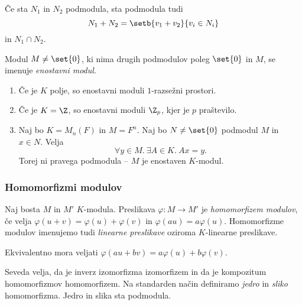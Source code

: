 \begin{trditev}
    Če sta $N_1$ in $N_2$ podmodula, sta podmodula tudi
    \[
        N_1 + N_2 = \setb{v_1 + v_2}{v_i \in N_i}
    \]
    in $N_1 \cap N_2$.
\end{trditev}


\begin{definicija}
    Modul $M \neq \set{0}$, ki nima drugih podmodulov poleg $\set{0}$ in $M$, se imenuje 
    \emph{enostavni modul}.
\end{definicija}

\begin{primer}
    \begin{enumerate}[(1)]
        \item Če je $K$ polje, so enostavni moduli $1$-razsežni prostori.
        \item Če je $K = \Z$, so enostavni moduli $\Z_p$, kjer je $p$ praštevilo.
        \item Naj bo $K = M_n(F)$ in $M = F^n$. Naj bo $N \neq \set{0}$ podmodul $M$ in 
        $x \in N$. Velja
        \[
            \forall y \in M.~\exists A \in K.~Ax = y.
        \]
        Torej ni pravega podmodula -- $M$ je enostaven $K$-modul.
    \end{enumerate}
\end{primer}

\subsubsection*{Homomorfizmi modulov}

\begin{definicija}
    Naj bosta $M$ in $M'$ $K$-modula. Preslikava $\varphi \colon M \to M'$ je 
    \emph{homomorfizem modulov}, če velja 
    $\varphi(u+v) = \varphi(u) + \varphi(v)$ in $\varphi(au) = a \varphi(u)$.
    Homomorfizme modulov imenujemo tudi \emph{linearne preslikave}
    oziroma $K$-linearne preslikave.
\end{definicija}

Ekvivalentno mora veljati $\varphi(au + bv) = a\varphi(u) + b \varphi(v)$.

Seveda velja, da je inverz izomorfizma izomorfizem in da je kompozitum homomorfizmov 
homomorfizem. Na standarden način definiramo \emph{jedro} in \emph{sliko} homomorfizma.
Jedro in slika sta podmodula.


